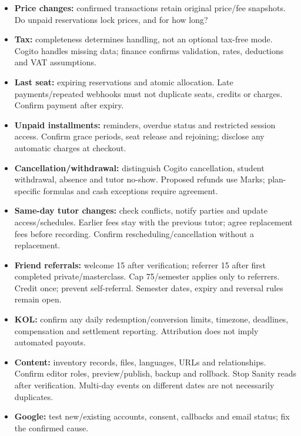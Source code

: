\documentclass[11pt,a4paper]{article}
\begin{document}
\begin{itemize}
\item \textbf{Price changes:} confirmed transactions retain original price/\allowbreak{}fee snapshots. Do unpaid reservations lock prices, and for how long?
\item \textbf{Tax:} completeness determines handling, not an optional tax-free mode. Cogito handles missing data; finance confirms validation, rates, deductions and VAT assumptions.
\item \textbf{Last seat:} expiring reservations and atomic allocation. Late payments/\allowbreak{}repeated webhooks must not duplicate seats, credits or charges. Confirm payment after expiry.
\item \textbf{Unpaid installments:} reminders, overdue status and restricted session access. Confirm grace periods, seat release and rejoining; disclose any automatic charges at checkout.
\item \textbf{Cancellation/\allowbreak{}withdrawal:} distinguish Cogito cancellation, student withdrawal, absence and tutor no-show. Proposed refunds use Marks; plan-specific formulas and cash exceptions require agreement.
\item \textbf{Same-day tutor changes:} check conflicts, notify parties and update access/\allowbreak{}schedules. Earlier fees stay with the previous tutor; agree replacement fees before recording. Confirm rescheduling/\allowbreak{}cancellation without a replacement.
\item \textbf{Friend referrals:} welcome 15 after verification; referrer 15 after first completed private/\allowbreak{}masterclass. Cap 75/\allowbreak{}semester applies only to referrers. Credit once; prevent self-referral. Semester dates, expiry and reversal rules remain open.
\item \textbf{KOL:} confirm any daily redemption/\allowbreak{}conversion limits, timezone, deadlines, compensation and settlement reporting. Attribution does not imply automated payouts.
\item \textbf{Content:} inventory records, files, languages, URLs and relationships. Confirm editor roles, preview/\allowbreak{}publish, backup and rollback. Stop Sanity reads after verification. Multi-day events on different dates are not necessarily duplicates.
\item \textbf{Google:} test new/\allowbreak{}existing accounts, consent, callbacks and email status; fix the confirmed cause.
\end{itemize}
\end{document}

